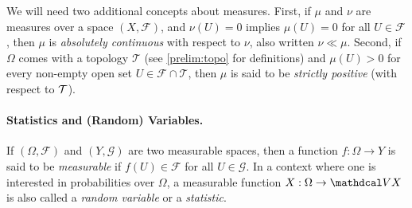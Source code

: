 We will need two additional concepts about measures.
First, if $\mu$ and $\nu$ are measures over a space $(X, \mathcal F)$, 
and $\nu(U) = 0$ implies $\mu(U) = 0$ for all $U \in \mathcal F$, then
$\mu$ is \emph{absolutely continuous} with respect to $\nu$, also written $\nu \ll \mu$.
Second, if $\Omega$ comes with a topology $\mathcal T$ (see \cref{prelim:topo} for definitions) and $\mu(U) > 0$ for every non-empty open set $U \in \mathcal F \cap \mathcal T$, then $\mu$ is said to be \emph{strictly positive} (with respect to $\cal T$).

\paragraph{Statistics and (Random) Variables.} 
If $(\Omega, \mathcal F)$ and $(Y, \mathcal G)$ are two measurable spaces, then
a function $f : \Omega \to Y$ is said to be \emph{measurable} if $f(U) \in \mathcal F$ for all $U \in \mathcal G$. 
In a context where one is interested in probabilities over $\Omega$, 
a measurable function $X : \Omega \to \V X$ is also called a \emph{random variable} or a \emph{statistic}.

